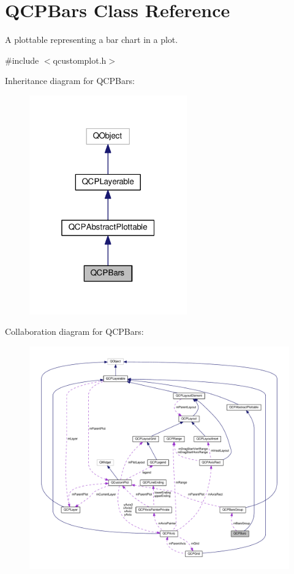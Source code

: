 \hypertarget{classQCPBars}{}\section{Q\+C\+P\+Bars Class Reference}
\label{classQCPBars}


A plottable representing a bar chart in a plot.  




{\ttfamily \#include $<$qcustomplot.\+h$>$}



Inheritance diagram for Q\+C\+P\+Bars\+:\nopagebreak
\begin{figure}[H]
\begin{center}
\leavevmode
\includegraphics[width=193pt]{classQCPBars__inherit__graph}
\end{center}
\end{figure}


Collaboration diagram for Q\+C\+P\+Bars\+:\nopagebreak
\begin{figure}[H]
\begin{center}
\leavevmode
\includegraphics[width=350pt]{classQCPBars__coll__graph}
\end{center}
\end{figure}
